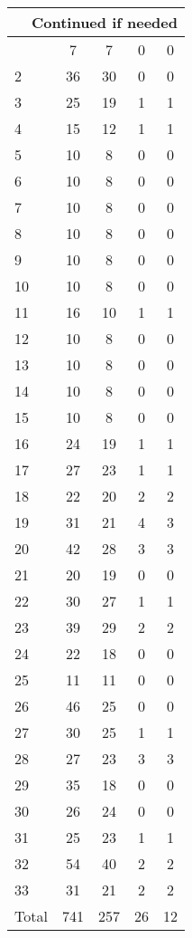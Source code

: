 \begin{center}
\begin{longtable}{l|c|c|c|c}
\hline \multicolumn{5}{|r|}{{Continued if needed}} \\ \hline
\endfoot 
1 & 7 & 7 & 0 & 0\\ \hline
2 & 36 & 30 & 0 & 0\\ \hline
3 & 25 & 19 & 1 & 1\\ \hline
4 & 15 & 12 & 1 & 1\\ \hline
5 & 10 & 8 & 0 & 0\\ \hline
6 & 10 & 8 & 0 & 0\\ \hline
7 & 10 & 8 & 0 & 0\\ \hline
8 & 10 & 8 & 0 & 0\\ \hline
9 & 10 & 8 & 0 & 0\\ \hline
10 & 10 & 8 & 0 & 0\\ \hline
11 & 16 & 10 & 1 & 1\\ \hline
12 & 10 & 8 & 0 & 0\\ \hline
13 & 10 & 8 & 0 & 0\\ \hline
14 & 10 & 8 & 0 & 0\\ \hline
15 & 10 & 8 & 0 & 0\\ \hline
16 & 24 & 19 & 1 & 1\\ \hline
17 & 27 & 23 & 1 & 1\\ \hline
18 & 22 & 20 & 2 & 2\\ \hline
19 & 31 & 21 & 4 & 3\\ \hline
20 & 42 & 28 & 3 & 3\\ \hline
21 & 20 & 19 & 0 & 0\\ \hline
22 & 30 & 27 & 1 & 1\\ \hline
23 & 39 & 29 & 2 & 2\\ \hline
24 & 22 & 18 & 0 & 0\\ \hline
25 & 11 & 11 & 0 & 0\\ \hline
26 & 46 & 25 & 0 & 0\\ \hline
27 & 30 & 25 & 1 & 1\\ \hline
28 & 27 & 23 & 3 & 3\\ \hline
29 & 35 & 18 & 0 & 0\\ \hline
30 & 26 & 24 & 0 & 0\\ \hline
31 & 25 & 23 & 1 & 1\\ \hline
32 & 54 & 40 & 2 & 2\\ \hline
33 & 31 & 21 & 2 & 2\\ \hline
Total & 741 & 257 & 26 & 12
\end{longtable}
\end{center}



